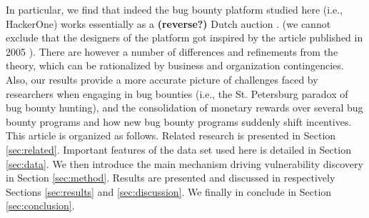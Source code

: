 In particular, we find that indeed the bug bounty platform studied here (i.e., HackerOne) works essentially as a {\bf (reverse?)} Dutch auction \cite{}. (we cannot exclude that the designers of the platform got inspired by the article published in 2005 \cite{ozment2004bug}). There are however a number of differences and refinements from the theory, which can be rationalized by business and organization contingencies. Also, our results provide a more accurate picture of challenges faced by researchers when engaging in bug bounties (i.e., the St. Petersburg paradox of bug bounty hunting), and the consolidation of monetary rewards over several bug bounty programs and how new bug bounty programs suddenly shift incentives.\\

This article is organized as follows. Related research is presented in Section \ref{sec:related}. Important features of the data set used here is detailed in Section \ref{sec:data}. We then introduce the main mechanism driving vulnerability discovery in Section \ref{sec:method}. Results are presented and discussed in respectively Sections \ref{sec:results} and \ref{sec:discussion}. We finally in conclude in Section \ref{sec:conclusion}.